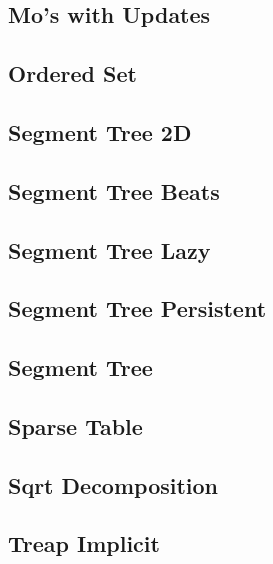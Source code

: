 \subsection{Mo's with Updates}
\raggedbottom
\hrulefill
\subsection{Ordered Set}
\raggedbottom
\hrulefill
\subsection{Segment Tree 2D}
\raggedbottom
\hrulefill
\subsection{Segment Tree Beats}
\raggedbottom
\hrulefill
\subsection{Segment Tree Lazy}
\raggedbottom
\hrulefill
\subsection{Segment Tree Persistent}
\raggedbottom
\hrulefill
\subsection{Segment Tree}
\raggedbottom
\hrulefill
\subsection{Sparse Table}
\raggedbottom
\hrulefill
\subsection{Sqrt Decomposition}
\raggedbottom
\hrulefill
\subsection{Treap Implicit}
\raggedbottom
\hrulefill
